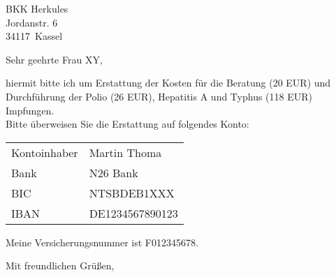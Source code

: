\documentclass[a4paper, 12pt, KOMAold]{scrlttr2}
\newcommand{\Vorname}{Martin}     %
\newcommand{\Nachname}{Thoma}     %
\newcommand{\Kundennr}{F012345678}%
\newcommand{\Bank}{N26 Bank}                   %
\newcommand{\BIC}{NTSBDEB1XXX}                                      %
\newcommand{\IBAN}{DE1234567890123}                                 %
\newcommand{\EmpfaengerName}{Frau XY}       %
\newcommand{\Empfaenger}{BKK Herkules }     %
\newcommand{\EStrasse}{Jordanstr. 6 }       %
\newcommand{\EPLZ}{34117}                   %
\newcommand{\EOrt}{Kassel}                  %
\newcommand{\DocTitle}{Erstattung: Reiseimpfungen} %
\begin{document}
    \begin{letter}{\Empfaenger \\ \EStrasse \\ \EPLZ~\EOrt}
    \date{\today}%
    \subject{\DocTitle}
    \opening{Sehr geehrte \EmpfaengerName{},}
    hiermit bitte ich um Erstattung der Kosten für die Beratung (20 EUR) und Durchführung
    der Polio (26 EUR), Hepatitis A und Typhus (118 EUR) Impfungen.\\

    \noindent{}Bitte überweisen Sie die Erstattung auf folgendes Konto:

    \begin{tabular}{ll}
    Kontoinhaber & \Vorname{} \Nachname{}        \\
    Bank         & \Bank     \\
    BIC          & \BIC      \\
    IBAN         & \IBAN     \\
    \end{tabular}

    Meine Versicherungsnummer ist \Kundennr{}.

    \closing{Mit freundlichen Grüßen,}
    \end{letter}
\end{document}
